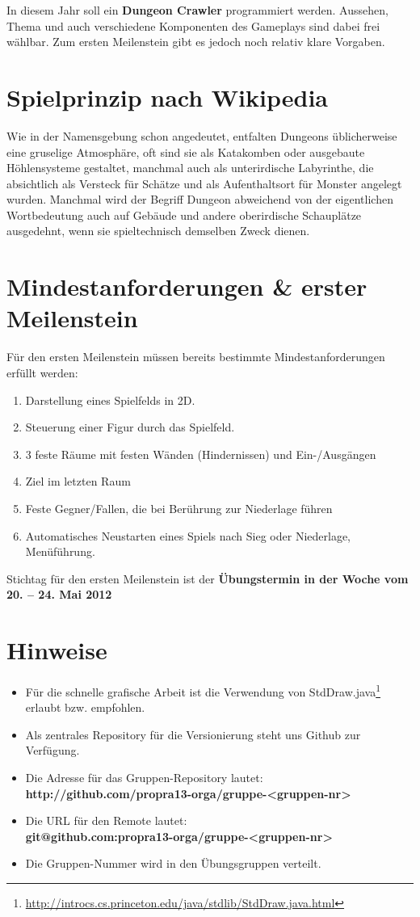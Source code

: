 \documentclass{programmierpraktikum}
\subtitle{Dungeon Crawler}
\begin{document}
%
\maketitle
In diesem Jahr soll ein \textbf{Dungeon Crawler} programmiert werden. Aussehen, Thema und auch
verschiedene Komponenten des Gameplays sind dabei frei wählbar. Zum ersten Meilenstein gibt es
jedoch noch relativ klare Vorgaben.
%
\section{Spielprinzip nach Wikipedia}
Wie in der Namensgebung schon angedeutet, entfalten Dungeons üblicherweise eine gruselige
Atmosphäre, oft sind sie als Katakomben oder ausgebaute Höhlensysteme gestaltet, manchmal auch
als unterirdische Labyrinthe, die absichtlich als Versteck für Schätze und als Aufenthaltsort
für Monster angelegt wurden. Manchmal wird der Begriff Dungeon abweichend von der eigentlichen
Wortbedeutung auch auf Gebäude und andere oberirdische Schauplätze ausgedehnt, wenn sie spieltechnisch
demselben Zweck dienen.
%
\section{Mindestanforderungen \& erster Meilenstein}
Für den ersten Meilenstein müssen bereits bestimmte Mindestanforderungen erfüllt werden:
\begin{enumerate}
  \item Darstellung eines Spielfelds in 2D.
  \item Steuerung einer Figur durch das Spielfeld.
  \item 3 feste Räume mit festen Wänden (Hindernissen) und Ein-/Ausgängen
  \item Ziel im letzten Raum
  \item Feste Gegner/Fallen, die bei Berührung zur Niederlage führen
  \item Automatisches Neustarten eines Spiels nach Sieg oder Niederlage, Menüführung.
\end{enumerate}
Stichtag für den ersten Meilenstein ist der \textbf{Übungstermin in der Woche vom 20. -- 24. Mai 2012}
%
\section{Hinweise}
\begin{itemize}
  \item Für die schnelle grafische Arbeit ist die Verwendung von
    StdDraw.java\footnote{\url{http://introcs.cs.princeton.edu/java/stdlib/StdDraw.java.html}} erlaubt
    bzw. empfohlen.
  \item Als zentrales Repository für die Versionierung steht uns Github zur Verfügung.
  \item Die Adresse für das Gruppen-Repository lautet:\\
    \textbf{http://github.com/propra13-orga/gruppe-<gruppen-nr>}
  \item Die URL für den Remote lautet:\\
    \textbf{git@github.com:propra13-orga/gruppe-<gruppen-nr>}
  \item Die Gruppen-Nummer wird in den Übungsgruppen verteilt.
\end{itemize}
%
\end{document}
